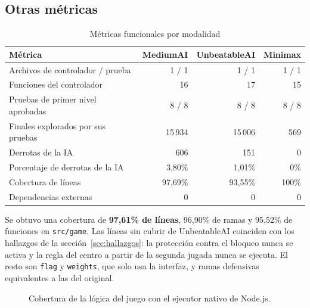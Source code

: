 \documentclass[12pt,a4paper]{article}
\begin{document}
\subsection{Otras métricas}
\begin{table}[H]
\centering\small
\caption{Métricas funcionales por modalidad}
\begin{tabular}{p{4.6cm}rrr}
\toprule Métrica & MediumAI & UnbeatableAI & Minimax\\\midrule
Archivos de controlador / prueba & 1 / 1 & 1 / 1 & 1 / 1\\
Funciones del controlador & 16 & 17 & 15\\
Pruebas de primer nivel aprobadas & 8 / 8 & 8 / 8 & 8 / 8\\
Finales explorados por sus pruebas & 15\,934 & 15\,006 & 569\\
Derrotas de la IA & 606 & 151 & 0\\
Porcentaje de derrotas de la IA & 3,80\% & 1,01\% & 0\%\\
Cobertura de líneas & 97,69\% & 93,55\% & 100\%\\
Dependencias externas & 0 & 0 & 0\\
\bottomrule
\end{tabular}
\end{table}

Se obtuvo una cobertura de \textbf{97,61\% de líneas}, 96,90\% de ramas y 95,52\%
de funciones en \texttt{src/game}. Las líneas sin cubrir de UnbeatableAI coinciden
con los hallazgos de la sección~\ref{sec:hallazgos}: la protección contra el
bloqueo nunca se activa y la regla del centro a partir de la segunda jugada nunca
se ejecuta. El resto son \texttt{flag} y \texttt{weights}, que solo usa la
interfaz, y ramas defensivas equivalentes a las del original.

\begin{figure}[H]

\caption{Cobertura de la lógica del juego con el ejecutor nativo de Node.js.}
\label{fig:consola-cobertura}
\end{figure}
\end{document}

